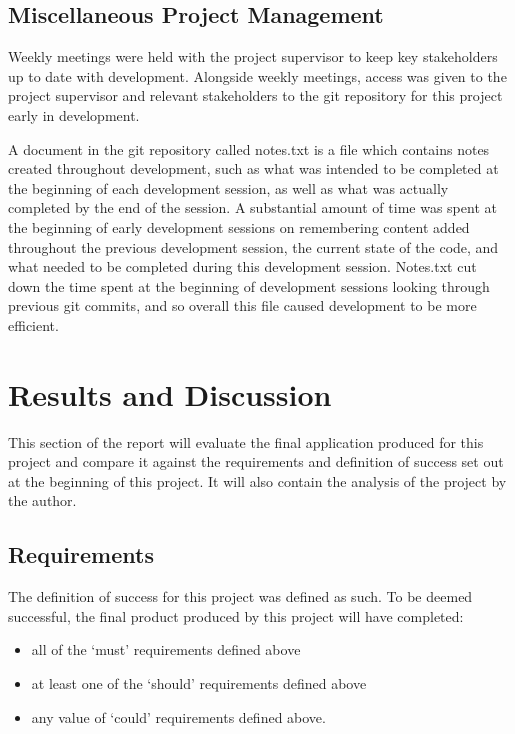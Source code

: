 \documentclass{article}
\begin{document}
\subsection{Miscellaneous Project Management}

Weekly meetings were held with the project supervisor to keep key stakeholders up to date with development. Alongside weekly meetings, access was given to the project supervisor and relevant stakeholders to the git repository for this project early in development. \par

A document in the git repository called notes.txt is a file which contains notes created throughout development, such as what was intended to be completed at the beginning of each development session, as well as what was actually completed by the end of the session. A substantial amount of time was spent at the beginning of early development sessions on remembering content added throughout the previous development session, the current state of the code, and what needed to be completed during this development session. Notes.txt cut down the time spent at the beginning of development sessions looking through previous git commits, and so overall this file caused development to be more efficient. \par

\section{Results and Discussion}
\label{section:results}

This section of the report will evaluate the final application produced for this project and compare it against the requirements and definition of success set out at the beginning of this project. It will also contain the analysis of the project by the author. 

\subsection{Requirements}

The definition of success for this project was defined as such. To be deemed successful, the final product produced by this project will have completed: 

\begin{itemize}
	\item all of the `must' requirements defined above
	\item at least one of the `should' requirements defined above
	\item any value of `could' requirements defined above.
\end{itemize}
\end{document}
